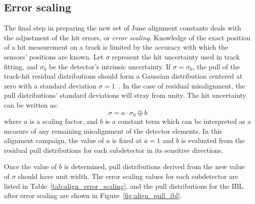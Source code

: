 \subsection{Error scaling}\label{align:2015_results_error_scaling}
The final step in preparing the new set of June alignment constants deals with the adjustment of the hit errors, or \emph{error scaling}.
Knowledge of the exact position of a hit measurement on a track is limited by the accuracy with which the sensors' positions are known.
Let $\sigma$ represent the hit uncertainty used in track fitting, and $\sigma_0$ be the detector's intrinsic uncertainty.
If $\sigma = \sigma_0$, the pull of the track-hit residual distributions should form a Gaussian distribution centered at zero with a standard deviation $\sigma = 1$~\cite{2011.alignment-7tev}.
In the case of residual misalignment, the pull distributions' standard deviations will stray from unity.
The hit uncertainty can be written as:
\begin{equation}
  \sigma = a\cdot\sigma_0\oplus b
  \label{eq:align_error_scaling}
\end{equation}
where $a$ is a scaling factor, and $b$ is a constant term which can be interpreted as a measure of any remaining misalignment of the detector elements.
In this alignment campaign, the value of $a$ is fixed at $a=1$ and $b$ is evaluated from the residual pull distributions for each subdetector in its sensitive directions.

Once the value of $b$ is determined, pull distributions derived from the new value of $\sigma$ should have unit width.
The error scaling values for each subdetector are listed in Table~\ref{tab:align_error_scaling}, and the pull distributions for the IBL after error scaling are shown in Figure~\ref{fig:align_pull_ibl}.

